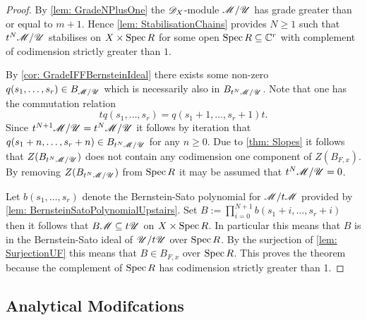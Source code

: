 \begin{proof}
  By \cref{lem: GradeNPlusOne} the $\mathscr{D}_X$-module $\mathscr{M}/\mathscr{U}$ has grade greater than or equal to $m + 1$.
  Hence \cref{lem: StabilisationChains} provides $N\geq 1$ such that $t^N\mathscr{M}/\mathscr{U}$ stabilises on $X\times\operatorname{Spec} R$ for some open $\operatorname{Spec} R\subseteq \mathbb{C}^r$ with complement of codimension strictly greater than $1$.

  By \cref{cor: GradeIFFBernsteinIdeal} there exists some non-zero $q(s_1,\ldots,s_r) \in B_{\mathscr{M}/\mathscr{U}}$ which is necessarily also in $B_{t^N\mathscr{M}/\mathscr{U}}$.
  Note that one has the commutation relation
  $$tq(s_1,\ldots,s_r) = q(s_1+1,\ldots, s_r + 1)t.$$
  Since $t^{N+1}\mathscr{M}/\mathscr{U} = t^N\mathscr{M}/\mathscr{U}$ it follows by iteration that $q(s_1+n,\ldots, s_r + n)\in B_{t^N \mathscr{M}/\mathscr{U}}$ for any $n\geq 0$.
  Due to \cref{thm: Slopes} it follows that $Z(B_{t^N\mathscr{M}/\mathscr{U}})$ does not contain any codimension one component of $Z(B_{F,x})$.
  By removing $Z(B_{t^N\mathscr{M}/\mathscr{U}})$ from $\operatorname{Spec} R$ it may be assumed that $t^N\mathscr{M}/\mathscr{U} = 0$.

  Let $b(s_1,\ldots,s_r)$ denote the Bernstein-Sato polynomial for $\mathscr{M}/t\mathscr{M}$ provided by \cref{lem: BernsteinSatoPolynomialUpstairs}.
  Set $B := \prod_{i=0}^{N+1} b(s_1 + i, \ldots, s_r + i)$ then it follows that
  $B\mathscr{M} \subseteq t\mathscr{U}$ on $X \times \operatorname{Spec} R$.
  In particular this means that $B$ is in the Bernstein-Sato ideal of $\mathscr{U}/t\mathscr{U}$ over $\operatorname{Spec} R$.
  By the surjection of \cref{lem: SurjectionUF} this means that $B\in B_{F,x}$ over $\operatorname{Spec} R$. This proves the theorem because the complement of $\operatorname{Spec} R$ has codimension strictly greater than 1.
\end{proof}
\subsection{Analytical Modifcations}
